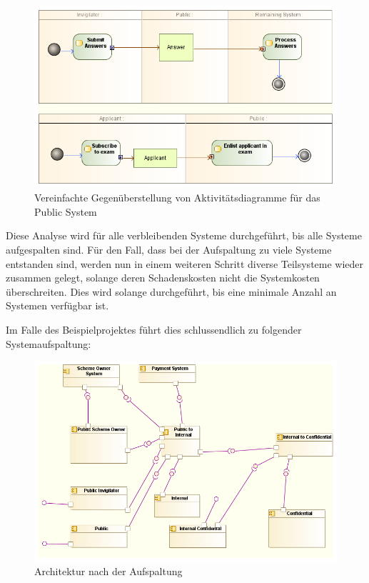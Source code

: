 \begin{figure}[H]
    \centering
    \includegraphics[scale=0.6]{uml/actorarch.png}
    \caption{Vereinfachte Gegenüberstellung von Aktivitätsdiagramme für das Public System}
    \label{fig:actorarch}
\end{figure}

Diese Analyse wird für alle verbleibenden Systeme durchgeführt, bis alle Systeme aufgespalten sind. Für den Fall, dass bei der Aufspaltung zu viele Systeme entstanden sind, werden nun in einem weiteren Schritt diverse Teilsysteme wieder zusammen gelegt, solange deren Schadenskosten nicht die Systemkosten überschreiten. Dies wird solange durchgeführt, bis eine minimale Anzahl an Systemen verfügbar ist.

Im Falle des Beispielprojektes führt dies schlussendlich zu folgender Systemaufspaltung:

\begin{figure}[H]
    \centering
    \includegraphics[scale=0.6]{uml/vision4.png}
    \caption{Architektur nach der Aufspaltung }
\end{figure}

